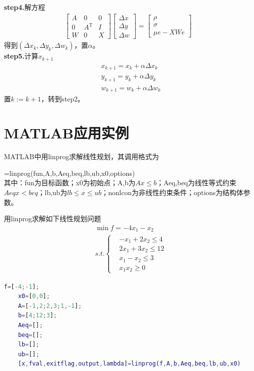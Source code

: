        \textbf{step4.}解方程
        \begin{align*}
        \begin{bmatrix} A & 0 & 0\\
        0 & A^\mathrm{T} & I\\ W & 0 & X \end{bmatrix}\begin{bmatrix}\Delta x\\\Delta y\\\Delta w \end{bmatrix}=\begin{bmatrix}\rho \\ \sigma \\\mu e-XWe\end{bmatrix}
        \end{align*}
        得到$(\Delta x_k,\Delta y_k,\Delta w_k)$，置$\alpha$。\\
        \textbf{step5.}计算$x_{k+1}$
        \begin{align*}
        &x_{k+1}=x_k+{\alpha}\Delta x_k \\
        &y_{k+1}=y_k+{\alpha}\Delta y_k\\
        &w_{k+1} =w_k+{\alpha}\Delta w_k
        \end{align*}
        置$k:=k+1$，转到step2。
\section{MATLAB应用实例}
    \par
    MATLAB中用linprog求解线性规划，其调用格式为
    \par
    [x,fval,exitflag,output]=linprog(fun,A,b,Aeq,beq,lb,ub,x0,options)\\
    其中：fun为目标函数；x0为初始点；A,b为$Ax \leqslant b$；Aeq,beq为线性等式约束$Aeq{}x < beq$；lb,ub为$lb \leqslant x \leqslant ub$；nonlcon为非线性约束条件；options为结构体参数。
    \par
    用linprog求解如下线性规划问题
    \begin{align*}
    &\mathop {\min} f=-4x_1-x_2\\
    &s.t.\left\{
    \begin{aligned}
    &-x_1+2x_2 \leqslant 4\\
    &2x_1+3x_2 \leqslant 12\\
    &x_1-x_2 \leqslant 3\\
    &x_1x_2 \geqslant 0
    \end{aligned}
    \right.
    \end{align*}
    \begin{lstlisting}[language=Matlab]
    f=[-4;-1];
    x0=[0,0];
    A=[-1,2;2,3;1,-1];
    b=[4;12;3];
    Aeq=[];
    beq=[];
    lb=[];
    ub=[];
    [x,fval,exitflag,output,lambda]=linprog(f,A,b,Aeq,beq,lb,ub,x0)
    \end{lstlisting}
